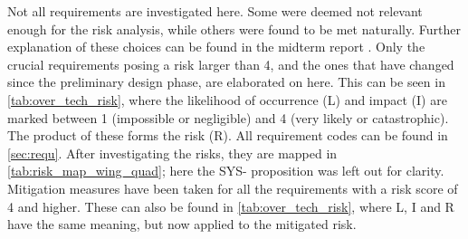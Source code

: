 Not all requirements are investigated here. Some were deemed not relevant enough for the risk analysis, while others were found to be met naturally. Further explanation of these choices can be found in the midterm report \cite{midterm}. Only the crucial requirements posing a risk larger than 4, and the ones that have changed since the preliminary design phase, are elaborated on here. This can be seen in \autoref{tab:over_tech_risk}, where the likelihood of occurrence (L) and impact (I) are marked between 1 (impossible or negligible) and 4 (very likely or catastrophic). The product of these forms the risk (R).  All requirement codes can be found in \autoref{sec:requ}. After investigating the risks, they are mapped in \autoref{tab:risk_map_wing_quad}; here the SYS- proposition was left out for clarity. Mitigation measures have been taken for all the requirements with a risk score of 4 and higher. These can also be found in \autoref{tab:over_tech_risk}, where L, I and R have the same meaning, but now applied to the mitigated risk. 


